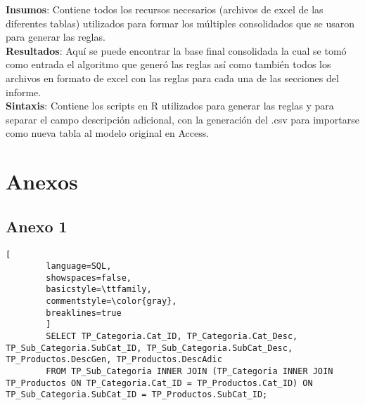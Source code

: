 \documentclass[]{article}
\begin{document}
	\textbf{Insumos}: Contiene todos los recursos necesarios (archivos de excel de las diferentes tablas) utilizados para formar los múltiples consolidados que se usaron para generar las reglas.\\
	
	\textbf{Resultados}: Aquí se puede encontrar la base final consolidada la cual se tomó como entrada el algoritmo que generó las reglas así como también todos los  archivos en formato de excel con las reglas para cada una de las secciones del informe.\\
	
	\textbf{Sintaxis}: Contiene los scripts en R utilizados para generar las reglas y para separar el campo descripción adicional, con la generación del .csv para importarse como nueva tabla al modelo original en Access.\\

	
	
	
	\section*{Anexos}
	\subsection*{Anexo 1}
	\label{subsec:Anexo1}
		\begin{lstlisting}[
		language=SQL,
		showspaces=false,
		basicstyle=\ttfamily,
		commentstyle=\color{gray},
		breaklines=true
		]
		SELECT TP_Categoria.Cat_ID, TP_Categoria.Cat_Desc, TP_Sub_Categoria.SubCat_ID, TP_Sub_Categoria.SubCat_Desc, TP_Productos.DescGen, TP_Productos.DescAdic
		FROM TP_Sub_Categoria INNER JOIN (TP_Categoria INNER JOIN TP_Productos ON TP_Categoria.Cat_ID = TP_Productos.Cat_ID) ON TP_Sub_Categoria.SubCat_ID = TP_Productos.SubCat_ID;
		
		\end{lstlisting}
	
	
\end{document}
